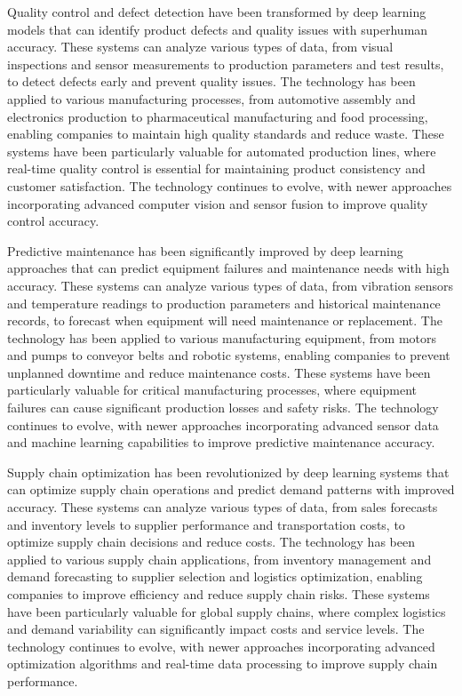 Quality control and defect detection have been transformed by deep learning models that can identify product defects and quality issues with superhuman accuracy. These systems can analyze various types of data, from visual inspections and sensor measurements to production parameters and test results, to detect defects early and prevent quality issues. The technology has been applied to various manufacturing processes, from automotive assembly and electronics production to pharmaceutical manufacturing and food processing, enabling companies to maintain high quality standards and reduce waste. These systems have been particularly valuable for automated production lines, where real-time quality control is essential for maintaining product consistency and customer satisfaction. The technology continues to evolve, with newer approaches incorporating advanced computer vision and sensor fusion to improve quality control accuracy.

Predictive maintenance has been significantly improved by deep learning approaches that can predict equipment failures and maintenance needs with high accuracy. These systems can analyze various types of data, from vibration sensors and temperature readings to production parameters and historical maintenance records, to forecast when equipment will need maintenance or replacement. The technology has been applied to various manufacturing equipment, from motors and pumps to conveyor belts and robotic systems, enabling companies to prevent unplanned downtime and reduce maintenance costs. These systems have been particularly valuable for critical manufacturing processes, where equipment failures can cause significant production losses and safety risks. The technology continues to evolve, with newer approaches incorporating advanced sensor data and machine learning capabilities to improve predictive maintenance accuracy.

Supply chain optimization has been revolutionized by deep learning systems that can optimize supply chain operations and predict demand patterns with improved accuracy. These systems can analyze various types of data, from sales forecasts and inventory levels to supplier performance and transportation costs, to optimize supply chain decisions and reduce costs. The technology has been applied to various supply chain applications, from inventory management and demand forecasting to supplier selection and logistics optimization, enabling companies to improve efficiency and reduce supply chain risks. These systems have been particularly valuable for global supply chains, where complex logistics and demand variability can significantly impact costs and service levels. The technology continues to evolve, with newer approaches incorporating advanced optimization algorithms and real-time data processing to improve supply chain performance.

